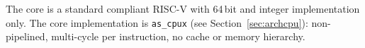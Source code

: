 The core is a standard compliant RISC-V with 64\,bit and integer implementation only.
The core implementation is \texttt{as\_cpux} (see Section~\ref{sec:archcpu}):
non-pipelined, multi-cycle per instruction, no cache or memory hierarchy.
